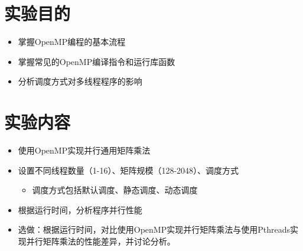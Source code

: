 \documentclass{SYSUReport}
\date{2026年5月6日}
\begin{document}
\cover
\thispagestyle{empty} %
\clearpage



\section{实验目的}
\begin{itemize}
    \item 掌握OpenMP编程的基本流程
    \item 掌握常见的OpenMP编译指令和运行库函数
    \item 分析调度方式对多线程程序的影响
\end{itemize}

\section{实验内容}
\begin{itemize}
 \item 使用OpenMP实现并行通用矩阵乘法
\item 设置不同线程数量（1-16）、矩阵规模（128-2048）、调度方式
\begin{itemize}
    \item 调度方式包括默认调度、静态调度、动态调度
\end{itemize}
\item 根据运行时间，分析程序并行性能
\item 选做：根据运行时间，对比使用OpenMP实现并行矩阵乘法与使用Pthreads实现并行矩阵乘法的性能差异，并讨论分析。
\end{itemize}
\end{document}
